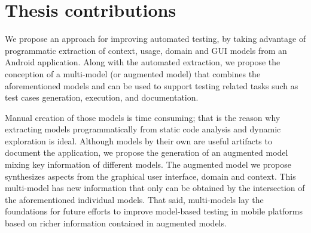 \section{Thesis contributions}

We  propose an approach for improving automated testing, by taking advantage of programmatic extraction of context, usage, domain and GUI models from an Android application. Along with the automated extraction, we propose the conception of a multi-model (or augmented model) that combines the aforementioned models and can be used to support testing related tasks such as test cases generation, execution, and documentation.



Manual creation of those models is time consuming; that is the reason why  extracting models programmatically from static code analysis and dynamic exploration is ideal. Although models by their own are useful artifacts to document the application, we propose the generation of an augmented model mixing key information of different models. The augmented model we propose synthesizes aspects from the graphical user interface, domain and context. This multi-model has new information that only can be obtained by the intersection of the aforementioned individual models. %
That said, multi-models lay the foundations for future efforts to improve model-based testing in mobile platforms based on richer information contained in augmented models.

